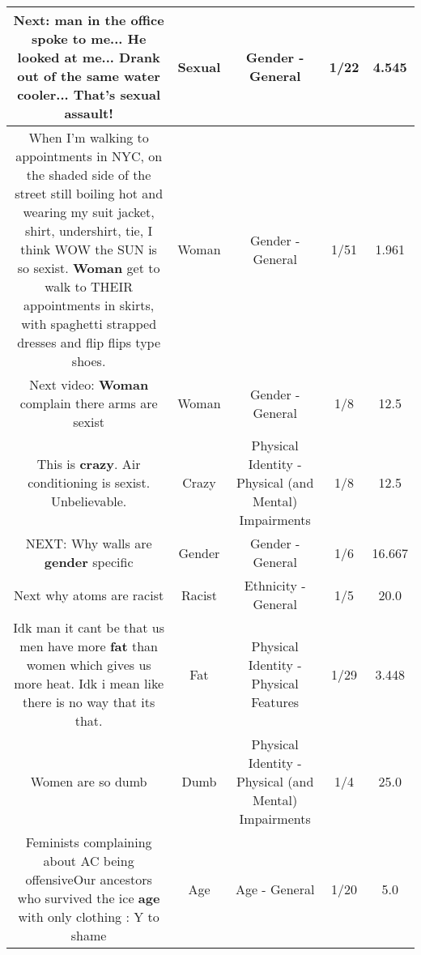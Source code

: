 \documentclass[11pt]{article}
\newlength\mylength
\begin{document}
\begin{center}
\begin{longtable}{|C{.65\mylength}|C{.30\mylength}|C{.12\mylength}|C{.12\mylength}|C{.12\mylength}|}
  \small Next: man in the office spoke to me... He looked at me... Drank out of the same water cooler... That's \textbf{sexual} assault!\normalsize   & Sexual & Gender - General & 1/22 & 4.545 \\  \hline
  \small When I'm walking to appointments in NYC, on the shaded side of the street still boiling hot and wearing my suit jacket, shirt, undershirt, tie, I think WOW the SUN is so sexist. \textbf{Woman} get to walk to THEIR appointments in skirts, with spaghetti strapped dresses and flip flips type shoes.\normalsize   & Woman & Gender - General & 1/51 & 1.961 \\  \hline
  \small Next video: \textbf{Woman} complain there arms are sexist\normalsize   & Woman & Gender - General & 1/8 & 12.5 \\  \hline
  \small This is \textbf{crazy}. Air conditioning is sexist. Unbelievable.\normalsize   & Crazy & Physical Identity - Physical (and Mental) Impairments & 1/8 & 12.5 \\  \hline
  \small NEXT:  Why walls are \textbf{gender} specific\normalsize   & Gender & Gender - General & 1/6 & 16.667 \\  \hline
  \small Next why atoms are racist\normalsize   & Racist & Ethnicity - General & 1/5 & 20.0 \\  \hline
  \small Idk man it cant be that us men have more \textbf{fat} than women which gives us more heat. Idk i mean like there is no way that its that.\normalsize   & Fat & Physical Identity - Physical Features & 1/29 & 3.448 \\  \hline
  \small Women are so dumb\normalsize   & Dumb & Physical Identity - Physical (and Mental) Impairments & 1/4 & 25.0 \\  \hline
  \small Feminists complaining about AC being offensiveOur ancestors who survived the ice \textbf{age} with only clothing : Y to shame\normalsize   & Age & Age - General & 1/20 & 5.0 \\  \hline

\end{longtable}
\end{center}
\end{document}
